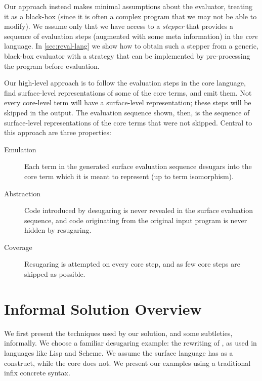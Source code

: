 Our approach instead makes minimal assumptions about the
evaluator, treating it as a black-box (since it is often a complex
program that we may not be able to modify).
We assume only that we have access to a \emph{stepper} that
provides a sequence of evaluation steps (augmented with some
meta information) in the \emph{core} language. In 
\cref{sec:reval-lang} we show how to obtain such a stepper from a generic,
black-box
evaluator with a strategy that can be implemented by pre-processing
the program before evaluation.

Our high-level approach is to follow the evaluation steps in the core
language, find surface-level representations of some of the core
terms, and emit them. Not every core-level term will have a
surface-level representation; these steps will be skipped in the
output. The evaluation sequence shown, then, is the sequence of
surface-level representations of the core terms that were not
skipped. Central to this approach are three properties:

\begin{description}
\item[Emulation] Each term in the generated surface evaluation
  sequence desugars into the core term which it is meant to represent
  (up to term isomorphism).
\item[Abstraction] Code introduced by desugaring is never revealed in the
  surface evaluation sequence, and code originating from the original
  input program is never hidden by resugaring.
\item[Coverage] Resugaring is attempted on every core step, and as few
  core steps are skipped as possible.
\end{description}

\section{Informal Solution Overview}
\label{sec:reval-exposition}

We first present the techniques used by our solution, and some subtleties,
informally. We choose a familiar desugaring example: the rewriting
of , as used in languages like Lisp and Scheme. We assume
the surface language has  as a construct, while the core does
not. We present our examples using a traditional infix concrete syntax.

